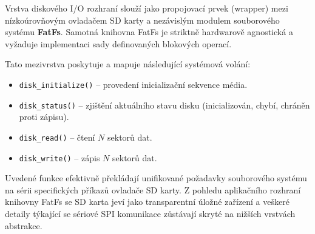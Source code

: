 \documentclass[11pt, a4paper, plain]{article}
\begin{document}
Vrstva diskového I/O rozhraní slouží jako propojovací prvek (wrapper) mezi nízkoúrovňovým
ovladačem SD karty a nezávislým modulem souborového systému \textbf{FatFs}. Samotná knihovna FatFs
je striktně hardwarově agnostická a vyžaduje implementaci sady definovaných blokových operací.

Tato mezivrstva poskytuje a mapuje následující systémová volání:

\begin{itemize}
    \item \texttt{disk\_initialize()} – provedení inicializační sekvence média.
    \item \texttt{disk\_status()} – zjištění aktuálního stavu disku (inicializován, chybí, chráněn proti zápisu).
    \item \texttt{disk\_read()} – čtení $N$ sektorů dat.
    \item \texttt{disk\_write()} – zápis $N$ sektorů dat.
\end{itemize}

Uvedené funkce efektivně překládají unifikované požadavky souborového systému na sérii specifických
příkazů ovladače SD karty. Z pohledu aplikačního rozhraní knihovny FatFs se SD karta
jeví jako transparentní úložné zařízení a veškeré detaily týkající se sériové SPI komunikace
zůstávají skryté na nižších vrstvách abstrakce.
\end{document}
